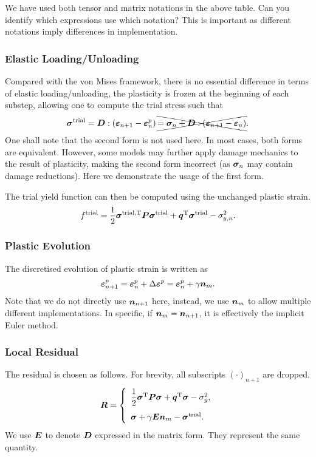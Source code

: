 We have used both tensor and matrix notations in the above table.
Can you identify which expressions use which notation?
This is important as different notations imply differences in implementation.
\subsubsection{Elastic Loading/Unloading}
Compared with the von Mises framework, there is no essential difference in terms of elastic loading/unloading, the plasticity is frozen at the beginning of each substep, allowing one to compute the trial stress such that
\begin{gather}
\bm{\sigma}^\text{trial}=\bm{D}:\left(\bm{\varepsilon}_{n+1}-\bm{\varepsilon}^p_n\right)\xcancel{=\bm{\sigma}_n+\bm{D}:\left(\bm{\varepsilon}_{n+1}-\bm{\varepsilon}_n\right)}.
\end{gather}
One shall note that the second form is not used here.
In most cases, both forms are equivalent.
However, some models may further apply damage mechanics to the result of plasticity, making the second form incorrect (as $\bm{\sigma}_n$ may contain damage reductions).
Here we demonstrate the usage of the first form.

The trial yield function can then be computed using the unchanged plastic strain.
\begin{gather}
f^\text{trial}=\dfrac{1}{2}\bm{\sigma}^\text{trial,T}\bm{P}\bm{\sigma}^\text{trial}+\bm{q}^{\mathrm{T}}\bm{\sigma}^\text{trial}-\sigma_{y,n}^2.
\end{gather}
\subsubsection{Plastic Evolution}
The discretised evolution of plastic strain is written as
\begin{gather}
\bm{\varepsilon}^p_{n+1}=\bm{\varepsilon}^p_{n}+\Delta\bm{\varepsilon}^p=\bm{\varepsilon}^p_{n}+\gamma\bm{n}_{m}.
\end{gather}
Note that we do not directly use $\bm{n}_{n+1}$ here, instead, we use $\bm{n}_{m}$ to allow multiple different implementations.
In specific, if $\bm{n}_{m}=\bm{n}_{n+1}$, it is effectively the implicit Euler method.
\subsubsection{Local Residual}
The residual is chosen as follows. For brevity, all subscripts $\left(\cdot\right)_{n+1}$ are dropped.
\begin{gather}
\bm{R}=\left\{
\begin{array}{l}
\dfrac{1}{2}\bm{\sigma}^{\mathrm{T}}\bm{P}\bm{\sigma}+\bm{q}^{\mathrm{T}}\bm{\sigma}-\sigma_y^2,\\[4mm]
\bm{\sigma}+\gamma\bm{E}\bm{n}_m-\bm{\sigma}^\text{trial}.
\end{array}
\right.
\end{gather}
We use $\bm{E}$ to denote $\bm{D}$ expressed in the matrix form.
They represent the same quantity.

